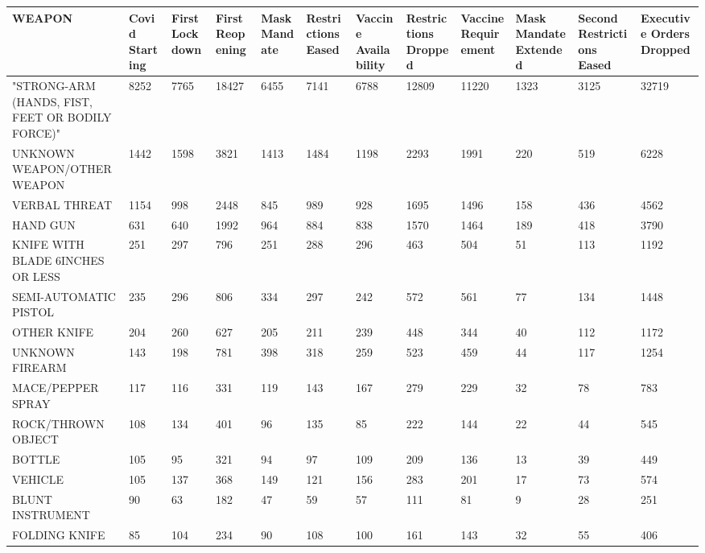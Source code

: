 \documentclass{article}
\begin{document}
\pagestyle{empty}

\begin{landscape}
\begin{table}[!ht]
    \centering
    \small
    \begin{tabular}{|p{2cm}|*{11}{p{1.7cm}|}}
    \hline
        WEAPON & Covid Starting & First Lockdown & First Reopening & Mask Mandate & Restrictions Eased & Vaccine Availability & Restrictions Dropped & Vaccine Requirement & Mask Mandate Extended & Second Restrictions Eased & Executive Orders Dropped \\ \hline
        "STRONG-ARM (HANDS, FIST, FEET OR BODILY FORCE)" & 8252 & 7765 & 18427 & 6455 & 7141 & 6788 & 12809 & 11220 & 1323 & 3125 & 32719 \\ \hline
        UNKNOWN WEAPON/OTHER WEAPON & 1442 & 1598 & 3821 & 1413 & 1484 & 1198 & 2293 & 1991 & 220 & 519 & 6228 \\ \hline
        VERBAL THREAT & 1154 & 998 & 2448 & 845 & 989 & 928 & 1695 & 1496 & 158 & 436 & 4562 \\ \hline
        HAND GUN & 631 & 640 & 1992 & 964 & 884 & 838 & 1570 & 1464 & 189 & 418 & 3790 \\ \hline
        KNIFE WITH BLADE 6INCHES OR LESS & 251 & 297 & 796 & 251 & 288 & 296 & 463 & 504 & 51 & 113 & 1192 \\ \hline
        SEMI-AUTOMATIC PISTOL & 235 & 296 & 806 & 334 & 297 & 242 & 572 & 561 & 77 & 134 & 1448 \\ \hline
        OTHER KNIFE & 204 & 260 & 627 & 205 & 211 & 239 & 448 & 344 & 40 & 112 & 1172 \\ \hline
        UNKNOWN FIREARM & 143 & 198 & 781 & 398 & 318 & 259 & 523 & 459 & 44 & 117 & 1254 \\ \hline
        MACE/PEPPER SPRAY & 117 & 116 & 331 & 119 & 143 & 167 & 279 & 229 & 32 & 78 & 783 \\ \hline
        ROCK/THROWN OBJECT & 108 & 134 & 401 & 96 & 135 & 85 & 222 & 144 & 22 & 44 & 545 \\ \hline
        BOTTLE & 105 & 95 & 321 & 94 & 97 & 109 & 209 & 136 & 13 & 39 & 449 \\ \hline
        VEHICLE & 105 & 137 & 368 & 149 & 121 & 156 & 283 & 201 & 17 & 73 & 574 \\ \hline
        BLUNT INSTRUMENT & 90 & 63 & 182 & 47 & 59 & 57 & 111 & 81 & 9 & 28 & 251 \\ \hline
        FOLDING KNIFE & 85 & 104 & 234 & 90 & 108 & 100 & 161 & 143 & 32 & 55 & 406 \\ \hline

\end{tabular}
\end{table}
\end{landscape}
\end{document}

